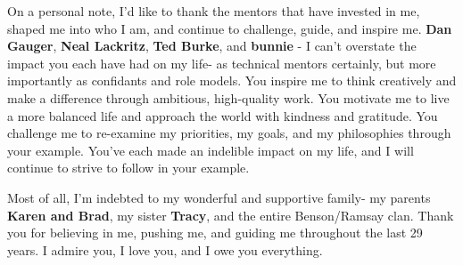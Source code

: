 On a personal note, I'd like to thank the mentors that have invested in me, shaped me into who I am, and continue to challenge, guide, and inspire me.  \textbf{Dan Gauger}, \textbf{Neal Lackritz}, \textbf{Ted Burke}, and \textbf{bunnie} - I can't overstate the impact you each have had on my life- as technical mentors certainly, but more importantly as confidants and role models.  You inspire me to think creatively and make a difference through ambitious, high-quality work.  You motivate me to live a more balanced life and approach the world with kindness and gratitude.  You challenge me to re-examine my priorities, my goals, and my philosophies through your example.  You've each made an indelible impact on my life, and I will continue to strive to follow in your example.   

Most of all, I'm indebted to my wonderful and supportive family- my parents \textbf{Karen and Brad}, my sister \textbf{Tracy}, and the entire Benson/Ramsay clan.  Thank you for believing in me, pushing me, and guiding me throughout the last 29 years.  I admire you, I love you, and I owe you everything.



\restoregeometry

